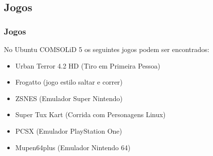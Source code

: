 \subsection{Jogos}

\begin{frame}


\end{frame}

\begin{frame}\frametitle{Jogos}

No Ubuntu COMSOLiD 5 os seguintes jogos podem ser encontrados:
\begin{itemize}
	\item Urban Terror 4.2 HD (Tiro em Primeira Pessoa)
	\item Frogatto (jogo estilo saltar e correr)
	\item ZSNES (Emulador Super Nintendo)
	\item Super Tux Kart (Corrida com Personagens Linux)
	\item PCSX (Emulador PlayStation One)
	\item Mupen64plus (Emulador Nintendo 64)
\end{itemize}

\end{frame}

